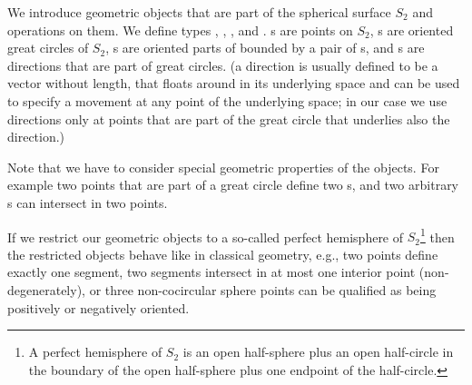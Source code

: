 
We introduce geometric objects that are part of the spherical surface
$S_2$ and operations on them. We define types ,
, , and .
s are points on $S_2$, s are
oriented great circles of $S_2$, s are oriented
parts of  bounded by a pair of
s, and s are directions that
are part of great circles. (a direction is usually defined to be a
vector without length, that floats around in its underlying space and
can be used to specify a movement at any point of the underlying
space; in our case we use directions only at points that are part of
the great circle that underlies also the direction.)

Note that we have to consider special geometric properties of the
objects. For example two points that are part of a great circle define
two s, and two arbitrary s can
intersect in two points.

If we restrict our geometric objects to a so-called perfect hemisphere
of $S_2$\footnote{A perfect hemisphere of $S_2$ is an open half-sphere
  plus an open half-circle in the boundary of the open half-sphere
  plus one endpoint of the half-circle.} then the restricted objects
behave like in classical geometry, e.g., two points define exactly one
segment, two segments intersect in at most one interior point
(non-degenerately), or three non-cocircular sphere points can be
qualified as being positively or negatively oriented.







